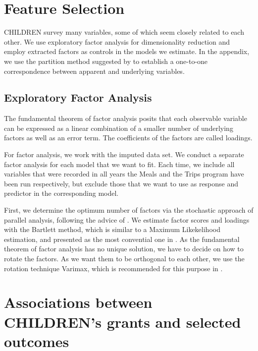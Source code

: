 \documentclass[12pt, a4paper, titlepage]{article}\usepackage[]{graphicx}\usepackage[]{color}
\begin{document}
\section{Feature Selection}

CHILDREN survey many variables, some of which seem closely related to each other. We use exploratory factor analysis for dimensionality reduction and employ extracted factors as controls in the models we estimate. In the appendix, we use the partition method suggested by \textcite{Millstein.2020} to establish a one-to-one correspondence between apparent and underlying variables.

\subsection{Exploratory Factor Analysis}

The fundamental theorem of factor analysis posits that each observable variable can be expressed as a linear combination of a smaller number of underlying factors as well as an error term. The coefficients of the factors are called loadings. \parencite[p.310]{Moosbrugger.2008} 

For factor analysis, we work with the imputed data set. We conduct a separate factor analysis for each model that we want to fit. Each time, we include all variables that were recorded in all years the Meals and the Trips program have been run respectively, but exclude those that we want to use as response and predictor in the corresponding model. 

First, we determine the optimum number of factors via the stochastic approach of parallel analysis, following the advice of \textcite[p.313]{Moosbrugger.2008}.
We estimate factor scores and loadings with the Bartlett method, which is similar to a Maximum Likekelihood estimation, and presented as the most convential one in \textcite[p.291]{Eid.2014}.
As the fundamental theorem of factor analysis has no unique solution, we have to decide on how to rotate the factors. As we want them to be orthogonal to each other, we use the rotation technique Varimax, which is recommended for this purpose in \textcite[p.317]{Price.2017}. 


\section{Associations between CHILDREN's grants and selected outcomes}
\end{document}
